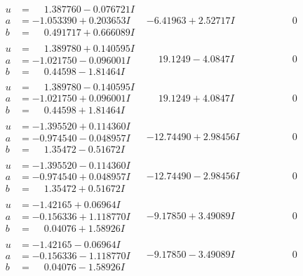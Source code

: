 \documentclass[1p]{elsarticle_modified}
\theoremstyle{definition}
\begin{document}
$$\begin{array}{c|c|c}
\begin{aligned}
u &= \phantom{-}1.387760 - 0.076721 I \\
a &= -1.053390 + 0.203653 I \\
b &= \phantom{-}0.491717 + 0.666089 I\end{aligned}
 & -6.41963 + 2.52717 I & \phantom{-0.000000 } 0 \\ \hline\begin{aligned}
u &= \phantom{-}1.389780 + 0.140595 I \\
a &= -1.021750 - 0.096001 I \\
b &= \phantom{-}0.44598 - 1.81464 I\end{aligned}
 & \phantom{-}19.1249 - 4.0847 I & \phantom{-0.000000 } 0 \\ \hline\begin{aligned}
u &= \phantom{-}1.389780 - 0.140595 I \\
a &= -1.021750 + 0.096001 I \\
b &= \phantom{-}0.44598 + 1.81464 I\end{aligned}
 & \phantom{-}19.1249 + 4.0847 I & \phantom{-0.000000 } 0 \\ \hline\begin{aligned}
u &= -1.395520 + 0.114360 I \\
a &= -0.974540 - 0.048957 I \\
b &= \phantom{-}1.35472 - 0.51672 I\end{aligned}
 & -12.74490 + 2.98456 I & \phantom{-0.000000 } 0 \\ \hline\begin{aligned}
u &= -1.395520 - 0.114360 I \\
a &= -0.974540 + 0.048957 I \\
b &= \phantom{-}1.35472 + 0.51672 I\end{aligned}
 & -12.74490 - 2.98456 I & \phantom{-0.000000 } 0 \\ \hline\begin{aligned}
u &= -1.42165 + 0.06964 I \\
a &= -0.156336 + 1.118770 I \\
b &= \phantom{-}0.04076 + 1.58926 I\end{aligned}
 & -9.17850 + 3.49089 I & \phantom{-0.000000 } 0 \\ \hline\begin{aligned}
u &= -1.42165 - 0.06964 I \\
a &= -0.156336 - 1.118770 I \\
b &= \phantom{-}0.04076 - 1.58926 I\end{aligned}
 & -9.17850 - 3.49089 I & \phantom{-0.000000 } 0 \\ \hline\begin{aligned}

\end{aligned}
\end{array}$$
\end{document}
